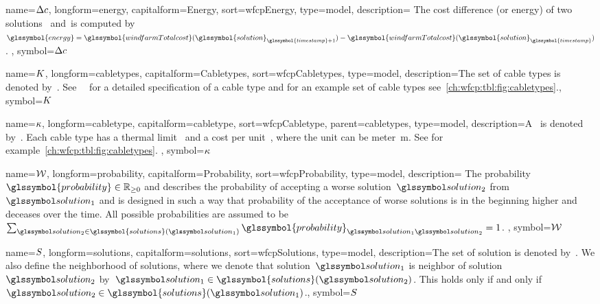 {
    name={\ensuremath{\Delta\energy}},
    longform={energy},
    capitalform={Energy},
    sort={wfcpEnergy},
    type={model},
    description={ The cost difference (or energy) of two solutions~\solutiona
        and~\solutionb is computed by~$
        \glssymbol{energy}
        =
        \glssymbol{windfarmTotalcost}(\glssymbol{solution}_{\glssymbol{timestamp}+1})
        -
        \glssymbol{windfarmTotalcost}(\glssymbol{solution}_{\glssymbol{timestamp}})
        $. 
    },
    symbol={\ensuremath{\Delta\energy}}
}

{
    name={\ensuremath{\cabletypes}},
    longform={cabletypes},
    capitalform={Cabletypes},
    sort={wfcpCabletypes},
    type={model},
    description={The set of cable types is denoted by~.
    See~~ for a detailed
    specification of a cable type and for an example set of cable types
    see~\cref{ch:wfcp:tbl:fig:cabletypes}.},
    symbol={\ensuremath{\cabletypes}}
}

{
    name={\ensuremath{\cabletype}},
    longform={cabletype},
    capitalform={cabletype},
    sort={wfcpCabletype},
    parent={cabletypes},
    type={model},
    description={A~ is denoted by~.
    Each cable type has a thermal limit~ and a cost per
    unit~, where the unit can be meter~\si{\metre}.
    See for example~\cref{ch:wfcp:tbl:fig:cabletypes}.
    },
    symbol={\ensuremath{\cabletype}}
}

{
    name={\ensuremath{\probability}},
    longform={probability},
    capitalform={Probability},
    sort={wfcpProbability},
    type={model},
    description={ The probability~$\glssymbol{probability}\in\posreals$ and
        describes the probability of accepting a worse solution~$\solutionb$
        from~$\solutiona$ and is designed in such a way that probability of the
        acceptance of worse solutions is in the beginning higher and deceases
        over the time. All possible probabilities are assumed to
        be~$\sum_{\solutionb\in\glssymbol{solutions}
        (\solutiona)}\glssymbol{probability}_{
        \solutiona\solutionb}=1$.
    },
    symbol={\ensuremath{\probability}}
}

{
    name={\ensuremath{\solutions}},
    longform={solutions},
    capitalform={solutions},
    sort={wfcpSolutions},
    type={model},
    description={The set of solution is denoted by~.
    We also define the neighborhood of solutions, where we denote that
    solution~$\solutiona$ is neighbor of solution~$\solutionb$
    by~$\solutiona\in\glssymbol{solutions}(\solutionb)$. This holds only if and
    only if~$\solutionb\in\glssymbol{solutions}(\solutiona)$.},
    symbol={\ensuremath{\solutions}}
}

